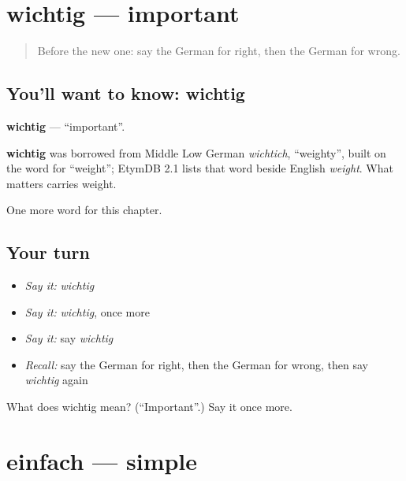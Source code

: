 \section[wichtig]{wichtig — important}

\label{lesson:GE-C93-wichtig}



\begin{quote}
Before the new one: say the German for right, then the German for wrong.
\end{quote}

\subsection*{You'll want to know: wichtig}
\textbf{wichtig} — \textquotedblleft{}important\textquotedblright{}.

\begin{cousinweb}
\textbf{wichtig} was borrowed from Middle Low German \emph{wichtich}, \textquotedblleft{}weighty\textquotedblright{}, built on the word for \textquotedblleft{}weight\textquotedblright{}; EtymDB 2.1 lists that word beside English \emph{weight}. What matters carries weight.
\end{cousinweb}

\begin{grammarlens}[title={What you've built}]
One more word for this chapter.
\end{grammarlens}

\subsection*{Your turn}
\begin{itemize}
\raggedright
  \item \emph{Say it:} \emph{wichtig}
  \item \emph{Say it:} \emph{wichtig}, once more
  \item \emph{Say it:} say \emph{wichtig}
  \item \emph{Recall:} say the German for right, then the German for wrong, then say \emph{wichtig} again
\end{itemize}

\begin{tcolorbox}[breakable,colback=teal!4,colframe=teal!35!black,title={Before you move on}]
What does wichtig mean? (\textquotedblleft{}Important\textquotedblright{}.) Say it once more.
\end{tcolorbox}
\section[einfach]{einfach — simple}

